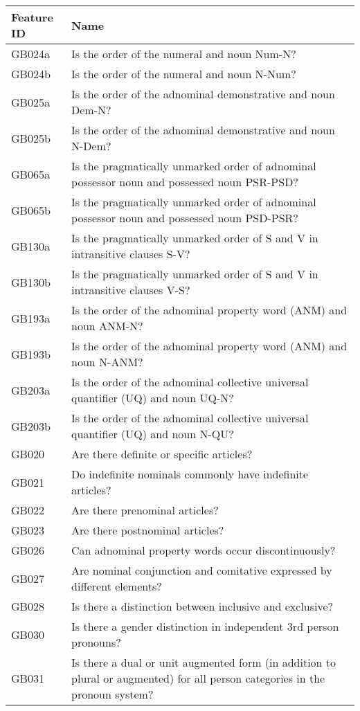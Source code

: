 \begin{longtable}{p{3cm}p{12cm}}
  \toprule
Feature ID & Name \\ 
  \midrule
GB024a & Is the order of the numeral and noun Num-N? \\ 
  GB024b & Is the order of the numeral and noun N-Num? \\ 
  GB025a & Is the order of the adnominal demonstrative and noun Dem-N? \\ 
  GB025b & Is the order of the adnominal demonstrative and noun N-Dem? \\ 
  GB065a & Is the pragmatically unmarked order of adnominal possessor noun and possessed noun PSR-PSD? \\ 
  GB065b & Is the pragmatically unmarked order of adnominal possessor noun and possessed noun PSD-PSR? \\ 
  GB130a & Is the pragmatically unmarked order of S and V in intransitive clauses S-V? \\ 
  GB130b & Is the pragmatically unmarked order of S and V in intransitive clauses V-S? \\ 
  GB193a & Is the order of the adnominal property word (ANM) and noun ANM-N? \\ 
  GB193b & Is the order of the adnominal property word (ANM) and noun N-ANM? \\ 
  GB203a & Is the order of the adnominal collective universal quantifier (UQ) and noun UQ-N? \\ 
  GB203b & Is the order of the adnominal collective universal quantifier (UQ) and noun N-QU? \\ 
  GB020 & Are there definite or specific articles? \\ 
  GB021 & Do indefinite nominals commonly have indefinite articles? \\ 
  GB022 & Are there prenominal articles? \\ 
  GB023 & Are there postnominal articles? \\ 
  GB026 & Can adnominal property words occur discontinuously? \\ 
  GB027 & Are nominal conjunction and comitative expressed by different elements? \\ 
  GB028 & Is there a distinction between inclusive and exclusive? \\ 
  GB030 & Is there a gender distinction in independent 3rd person pronouns? \\ 
  GB031 & Is there a dual or unit augmented form (in addition to plural or augmented) for all person categories in the pronoun system? \\ 

\end{longtable}
